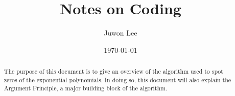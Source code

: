 \documentclass[11pt,reqno,oneside,a4paper]{article}
\author{Juwon Lee}
\title{Notes on Coding}
\date{\today}
\begin{document}
\maketitle
\thispagestyle{fancy}

\begin{abstract}
The purpose of this document is to give an overview of the algorithm used to spot zeros of the exponential polynomials.
In doing so, this document will also explain the Argument Principle, a major building block of the algorithm.
\end{abstract}
\end{document}
